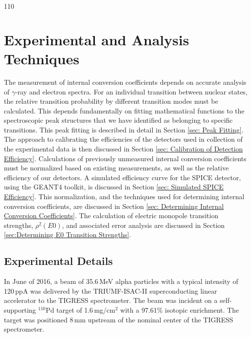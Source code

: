 110%

\chapter{Experimental and Analysis Techniques}
\label{ch:techniques}

The measurement of internal conversion coefficients depends on accurate analysis of $\gamma$-ray and electron spectra. For an individual transition between nuclear states, the relative transition probability by different transition modes must be calculated. This depends fundamentally on fitting mathematical functions to the spectroscopic peak structures that we have identified as belonging to specific transitions. This peak fitting is described in detail in Section \ref{sec: Peak Fitting}. The approach to calibrating the efficiencies of the detectors used in collection of the experimental data is then discussed in Section \ref{sec: Calibration of Detection Efficiency}. Calculations of previously unmeasured internal conversion coefficients must be normalized based on existing measurements, as well as the relative efficiency of our detectors. A simulated efficiency curve for the SPICE detector, using the GEANT4 toolkit, is discussed in Section \ref{sec: Simulated SPICE Efficiency}. This normalization, and the techniques used for determining internal conversion coefficients, are discussed in Section \ref{sec: Determining Internal Conversion Coefficients}. The calculation of electric monopole transition strengths, $\rho^2(E0)$, and associated error analysis are discussed in Section \ref{sec:Determining E0 Transition Strengths}.

\section{Experimental Details}
\label{sec: Experimental Details}

In June of 2016, a beam of 35.6\,MeV alpha particles with a typical intensity of 120\,ppA was delivered by the TRIUMF-ISAC-II superconducting linear accelerator to the TIGRESS spectrometer. The beam was incident on a self-supporting $^{110}$Pd target of 1.6\,mg/cm$^2$ with a 97.61\% isotopic enrichment. The target was positioned 8\,mm upstream of the nominal center of the TIGRESS spectrometer.

